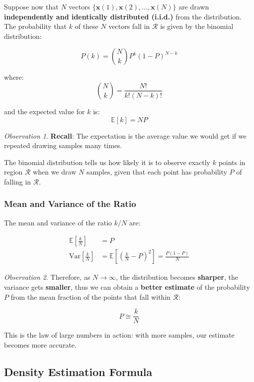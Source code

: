 \documentclass[11pt,a4paper]{article}
\theoremstyle{definition}
\theoremstyle{plain}
\theoremstyle{remark}
\newtheorem*{observation}{Observation}
\begin{document}
Suppose now that $N$ vectors $\{\mathbf{x}(1), \mathbf{x}(2), \ldots, \mathbf{x}(N)\}$ are drawn \textbf{independently and identically distributed (i.i.d.)} from the distribution. The probability that $k$ of these $N$ vectors fall in $\mathcal{R}$ is given by the binomial distribution:

\begin{tcolorbox}[colback=blue!5!white,colframe=blue!75!black,title=\textbf{Binomial Distribution}]
\[
P(k) = \binom{N}{k} P^k (1-P)^{N-k}
\]

where:
\[
\binom{N}{k} = \frac{N!}{k!(N-k)!}
\]

and the expected value for $k$ is:
\[
\mathbb{E}[k] = NP
\]
\end{tcolorbox}

\begin{observation}
\textbf{Recall}: The expectation is the average value we would get if we repeated drawing samples many times.

The binomial distribution tells us how likely it is to observe exactly $k$ points in region $\mathcal{R}$ when we draw $N$ samples, given that each point has probability $P$ of falling in $\mathcal{R}$.
\end{observation}

\subsubsection{Mean and Variance of the Ratio}

The mean and variance of the ratio $k/N$ are:

\begin{align}
\mathbb{E}\left[\frac{k}{N}\right] &= P \\
\text{Var}\left[\frac{k}{N}\right] &= \mathbb{E}\left[\left(\frac{k}{N} - P\right)^2\right] = \frac{P(1-P)}{N}
\end{align}

\begin{observation}
Therefore, as $N \to \infty$, the distribution becomes \textbf{sharper}, the variance gets \textbf{smaller}, thus we can obtain a \textbf{better estimate} of the probability $P$ from the mean fraction of the points that fall within $\mathcal{R}$:

\[
P \cong \frac{k}{N}
\]

This is the law of large numbers in action: with more samples, our estimate becomes more accurate.
\end{observation}

\subsection{Density Estimation Formula}
\end{document}
